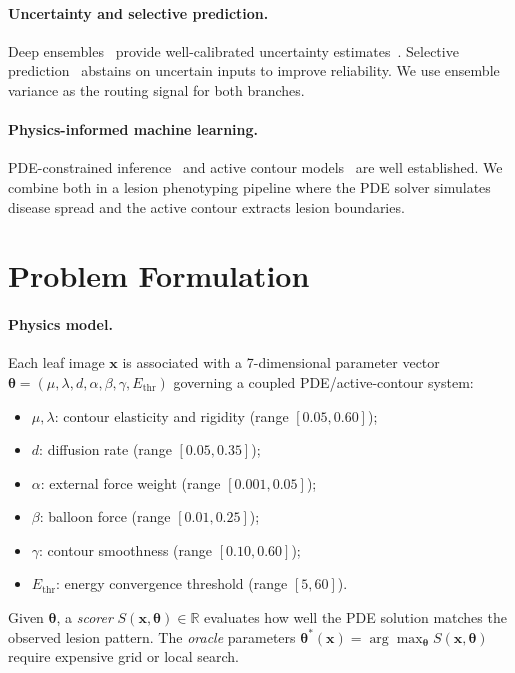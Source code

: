 \documentclass[11pt]{article}
\begin{document}
\paragraph{Uncertainty and selective prediction.}
Deep ensembles~\citep{lakshminarayanan2017simple} provide well-calibrated uncertainty estimates~\citep{ovadia2019can}.  Selective prediction~\citep{geifman2017selective,shalev2010trading} abstains on uncertain inputs to improve reliability.  We use ensemble variance as the routing signal for both branches.

\paragraph{Physics-informed machine learning.}
PDE-constrained inference~\citep{raissi2019physics,karniadakis2021physics} and active contour models~\citep{kass1988snakes,chan2001active} are well established.  We combine both in a lesion phenotyping pipeline where the PDE solver simulates disease spread and the active contour extracts lesion boundaries.


\section{Problem Formulation}
\label{sec:formulation}

\paragraph{Physics model.}
Each leaf image $\mathbf{x}$ is associated with a 7-dimensional parameter vector $\boldsymbol{\theta} = (\mu, \lambda, d, \alpha, \beta, \gamma, E_{\mathrm{thr}})$ governing a coupled PDE/active-contour system:
\begin{itemize}[leftmargin=1.5em,itemsep=1pt]
\item $\mu, \lambda$: contour elasticity and rigidity (range $[0.05, 0.60]$);
\item $d$: diffusion rate (range $[0.05, 0.35]$);
\item $\alpha$: external force weight (range $[0.001, 0.05]$);
\item $\beta$: balloon force (range $[0.01, 0.25]$);
\item $\gamma$: contour smoothness (range $[0.10, 0.60]$);
\item $E_{\mathrm{thr}}$: energy convergence threshold (range $[5, 60]$).
\end{itemize}
Given $\boldsymbol{\theta}$, a \emph{scorer} $S(\mathbf{x}, \boldsymbol{\theta}) \in \mathbb{R}$ evaluates how well the PDE solution matches the observed lesion pattern.  The \emph{oracle} parameters $\boldsymbol{\theta}^*(\mathbf{x}) = \arg\max_{\boldsymbol{\theta}} S(\mathbf{x}, \boldsymbol{\theta})$ require expensive grid or local search.
\end{document}
